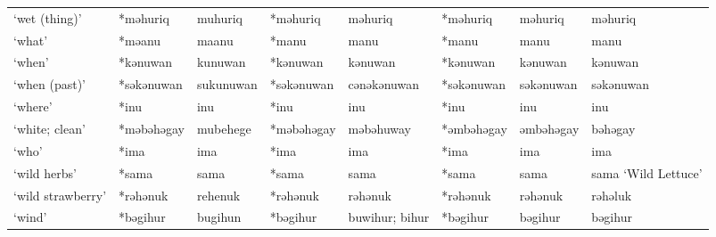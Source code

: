 \begin{landscape}
\begin{longtable}[c]{@{}p{3cm}<{\raggedright}p{2.75cm}<{\raggedright}p{2.75cm}<{\raggedright}p{2.75cm}<{\raggedright}p{2.75cm}<{\raggedright}p{2.75cm}<{\raggedright}p{2.75cm}<{\raggedright}p{2.75cm}<{\raggedright}@{}}
`wet (thing)'                                        & *məhuriq           & muhuriq                        & *məhuriq           & məhuriq                    & *məhuriq         & məhuriq                  & məhuriq                           \\
`what'                                               & *məanu             & maanu                          & *manu              & manu                       & *manu            & manu                     & manu                              \\
`when'                                               & *kənuwan           & kunuwan                        & *kənuwan           & kənuwan                    & *kənuwan         & kənuwan                  & kənuwan                           \\
`when (past)'                                        & *səkənuwan         & sukunuwan                      & *səkənuwan         & cənəkənuwan                & *səkənuwan       & səkənuwan                & səkənuwan                         \\
`where'                                              & *inu               & inu                            & *inu               & inu                        & *inu             & inu                      & inu                               \\
`white; clean'                                       & *məbəhəgay         & mubehege                       & *məbəhəgay         & məbəhuway                  & *əmbəhəgay       & əmbəhəgay                & bəhəgay                           \\
`who'                                                & *ima               & ima                            & *ima               & ima                        & *ima             & ima                      & ima                               \\
`wild herbs'                                         & *sama              & sama                           & *sama              & sama                       & *sama            & sama                     & sama `Wild Lettuce'               \\
`wild strawberry'                                    & *rəhənuk           & rehenuk                        & *rəhənuk           & rəhənuk                    & *rəhənuk         & rəhənuk                  & rəhəluk                           \\
`wind'                                               & *bəgihur           & bugihun                        & *bəgihur           & buwihur; bihur             & *bəgihur         & bəgihur                  & bəgihur                           \\

\end{longtable}
\end{landscape}
